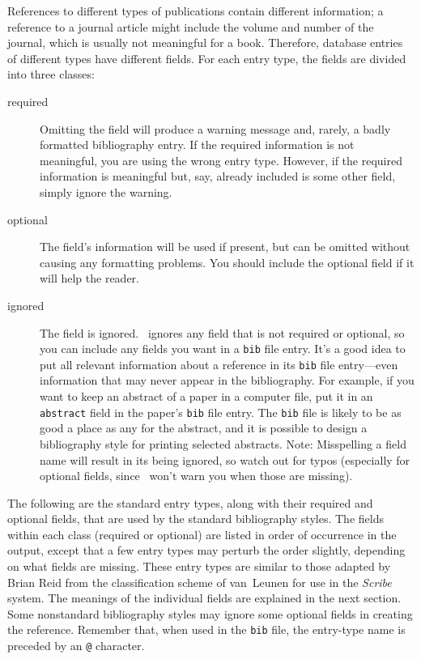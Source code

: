 References to different types of publications contain different
information; a reference to a journal article might include the volume
and number of the journal, which is usually not meaningful for a book.
Therefore, database entries of different types have different fields.
For each entry type, the fields are divided into three classes:
\begin{description}

\item[required]
Omitting the field will produce a warning message
and, rarely, a badly formatted bibliography entry.
If the required information is not meaningful,
you are using the wrong entry type.
However, if the required information is meaningful
but, say, already included is some other field,
simply ignore the warning.

\item[optional]
The field's information will be used if present,
but can be omitted without causing any formatting problems.
You should include the optional field if it will help the reader.

\item[ignored]
The field is ignored.
\BibTeX\ ignores any field that is not required or optional, so you can include
any fields you want in a \hbox{\tt bib} file entry.  It's a good idea
to put all relevant information about
a reference in its \hbox{\tt bib} file entry---even information that
may never appear in the bibliography.  For example, if you want to
keep an abstract of a paper in a computer file, put it in an \hbox{\tt
abstract} field in the paper's \hbox{\tt bib} file entry.  The
\hbox{\tt bib} file is likely to be as good a place as any for the
abstract, and it is possible to design a bibliography style for
printing selected abstracts.
Note: Misspelling a field name will
result in its being ignored,
so watch out for typos
(especially for optional fields,
since \BibTeX\ won't warn you when those are missing).

\end{description}

The following are the standard entry types, along with their required
and optional fields, that are used by the standard bibliography styles.
The fields within each class (required or optional)
are listed in order of occurrence in the output,
except that a few entry types may perturb the order slightly,
depending on what fields are missing.
These entry types are similar to those adapted by Brian Reid
from the classification scheme of van~Leunen\cite{van-leunen}
for use in the {\em Scribe\/} system.
The meanings of the individual fields are explained in the next section.
Some nonstandard bibliography styles may ignore some optional fields
in creating the reference.
Remember that, when used in the \hbox{\tt bib}
file, the entry-type name is preceded by an \hbox{\tt @} character.

